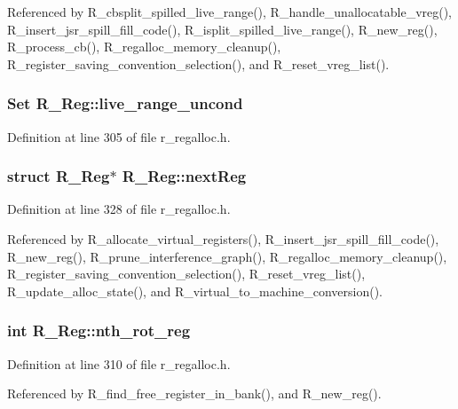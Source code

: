 Referenced by R\_\-cbsplit\_\-spilled\_\-live\_\-range(), R\_\-handle\_\-unallocatable\_\-vreg(), R\_\-insert\_\-jsr\_\-spill\_\-fill\_\-code(), R\_\-isplit\_\-spilled\_\-live\_\-range(), R\_\-new\_\-reg(), R\_\-process\_\-cb(), R\_\-regalloc\_\-memory\_\-cleanup(), R\_\-register\_\-saving\_\-convention\_\-selection(), and R\_\-reset\_\-vreg\_\-list().
\subsubsection{\setlength{\rightskip}{0pt plus 5cm}\bf{Set} \bf{R\_\-Reg::live\_\-range\_\-uncond}}\label{structR__Reg_1f3a006d48563af7b644c953bfd44651}




Definition at line 305 of file r\_\-regalloc.h.
\subsubsection{\setlength{\rightskip}{0pt plus 5cm}struct \bf{R\_\-Reg}$\ast$ \bf{R\_\-Reg::next\-Reg}}\label{structR__Reg_204086883b0b5f47eebc77e89c28f5a6}




Definition at line 328 of file r\_\-regalloc.h.

Referenced by R\_\-allocate\_\-virtual\_\-registers(), R\_\-insert\_\-jsr\_\-spill\_\-fill\_\-code(), R\_\-new\_\-reg(), R\_\-prune\_\-interference\_\-graph(), R\_\-regalloc\_\-memory\_\-cleanup(), R\_\-register\_\-saving\_\-convention\_\-selection(), R\_\-reset\_\-vreg\_\-list(), R\_\-update\_\-alloc\_\-state(), and R\_\-virtual\_\-to\_\-machine\_\-conversion().
\subsubsection{\setlength{\rightskip}{0pt plus 5cm}int \bf{R\_\-Reg::nth\_\-rot\_\-reg}}\label{structR__Reg_202334caaf4b50fcd0063a54c1bbdde0}




Definition at line 310 of file r\_\-regalloc.h.

Referenced by R\_\-find\_\-free\_\-register\_\-in\_\-bank(), and R\_\-new\_\-reg().
